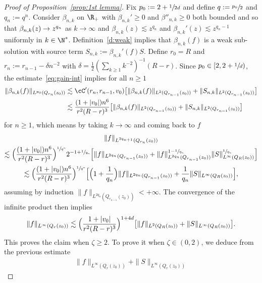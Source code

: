 \begin{proof}[Proof of Proposition~\ref{prop:1st lemma}]
Fix $p_0:=2+\sfrac{1}{2d}$ and define $q:=\sfrac{p_0}{2}$ and
$q_n := q^n$. Consider $\beta_{n,k}$ on $\R_+$ with
$\beta_{n,k}' \ge 0$ and $\beta''_{n,k} \ge 0$ both bounded and
so that $\beta_{n,k}(z) \to\nobreak z^{q_n}$ as $k \to \infty$ and
$\beta_{n,k}(z) \lesssim z^{q_n}$ and
$\beta_{n,k}'(z) \lesssim z^{q_n-1}$ uniformly in $k \in
\N^*$. Definition~\ref{d:weak} implies that
$\beta_{n,k}(f)$ is a weak sub-solution with source term
$S_{n,k} := \beta_{n,k}'(f) S$. Define $r_0=R$ and
$r_n := r_{n-1} - \delta n^{-2}$ with
$\delta = \frac12( \sum_{k \ge 1} k^{-2}
)^{-1}(R-r)$. Since $p_0 \in [2,2+\sfrac1d)$, the
estimate~\eqref{eq:gain-int} implies for all $n \ge 1$
\begin{align*}
\|\beta_{n,k}(f)\|_{L^{p_0}(Q_{r_n}(z_0))}
& \lesssim
\cC'(r_n,r_{n-1},v_0) \bigl[
\|\beta_{n,k}(f)\|_{L^{2}(Q_{r_{n-1}}(z_0))}
+ \|S_{n,k}\|_{L^2(Q_{r_{n-1}}(z_0))} \bigr] \\
& \lesssim \frac{(1+|v_0|)n^6}{r^2(R-r)^3}
\bigl[ \|\beta_{n,k}(f)\|_{L^{2}(Q_{r_{n-1}}(z_0))}
+ \|S_{n,k}\|_{L^2(Q_{r_{n-1}}(z_0))} \bigr]
\end{align*}
for $n \ge 1$, which means by taking $k \to \infty$ and coming
back to $f$
\begin{multline*}
\|f\|_{L^{2q_{n+1}}(Q_{r_n}(z_0))} \\
\lesssim \Bigl(
\frac{(1+|v_0|)n^6}{r^2(R-r)^3} \Bigr)^{\sfrac{1}{q^n}}
2^{-1+\sfrac{1}{q_n}} \Bigl[
\|f\|_{L^{2q_n}(Q_{r_{n-1}}(z_0))} + \|
f\|_{L^{2q_n}(Q_{r_{n-1}}(z_0))}^{1-\sfrac{1}{q_n}}
\|S\|_{L^\infty(Q_R(z_0))}^{\sfrac{1}{q_n}} \Bigr] \\
\lesssim \Bigl(
\frac{(1+|v_0|)n^6}{r^2(R-r)^3} \Bigr)^{\sfrac{1}{q^n}}
\Bigl[ \Bigl( 1 + \frac{1}{q_n} \Bigr)
\|f\|_{L^{2q_n}(Q_{r_{n-1}}(z_0))} + \frac{1}{q_n}
\|S\|_{L^\infty(Q_R(z_0))} \Bigr],
\end{multline*}
assuming by induction
$\|f\|_{L^{2q_n}(Q_{r_{n-1}}(z_0))} < +\infty$. The convergence
of the infinite product then implies
\begin{equation*}
\|f\|_{L^\infty(Q_r(z_0))}
\lesssim \Bigl( \frac{1+|v_0|}{r^2(R-r)^3}
\Bigr)^{1+4d} \bigl[ \|f\|_{L^2(Q_R(z_0))} +
\|S\|_{L^\infty(Q_R(z_0))} \bigr].
\end{equation*}
This proves the claim when $\zeta \ge 2$. To prove it when
$\zeta \in (0,2)$, we deduce from the previous estimate
\begin{multline*}
\|f\|_{L^\infty(Q_r(z_0))} + \|S\|_{L^\infty(Q_r(z_0))}

\end{multline*}
\end{proof}
